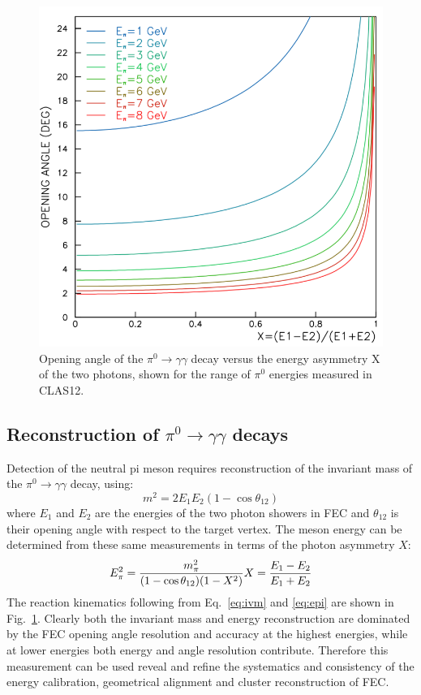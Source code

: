 \begin{figure}[h]
\centering
\includegraphics[width=0.7\columnwidth,keepaspectratio]{img/opa.png}
\caption[]{Opening angle of the $\pi^0 \rightarrow \gamma \gamma$ decay versus the energy asymmetry X of the two photons, shown for the range of $\pi^0$ energies measured in CLAS12. }
\label{fig:opa}
\end{figure}

\subsection{Reconstruction of $\pi^0\rightarrow \gamma \gamma$ decays}

Detection of the neutral pi meson requires reconstruction of the invariant mass of the $\pi^0 \rightarrow \gamma \gamma$ decay, using:
\begin{equation}
m^2 = 2 E_1 E_2 (1-\cos \theta_{12})
\label{eq:ivm}
\end{equation}
 where $E_1$ and $E_2$ are the energies of the two photon showers in FEC and $\theta_{12}$ is their opening angle with respect to the target vertex.  The meson energy can be determined from these same measurements in terms of the photon asymmetry $X$:
\begin{equation}
E^2_{\pi} = \frac{m^2_{\pi}}{(1-\cos \theta_{12})(1-X^2)}  \\
X=\frac{E_1-E_2}{E_1+E_2}
\label{eq:epi}
\end{equation}
The reaction kinematics following from Eq.~\ref{eq:ivm} and \ref{eq:epi} are shown in Fig.~\ref{fig:opa}.  Clearly both the invariant mass and energy reconstruction are dominated by the FEC opening angle resolution and accuracy at the highest energies, while at lower energies both energy and angle resolution contribute.   Therefore this measurement can be used reveal and refine the systematics and consistency of the energy calibration, geometrical alignment and cluster reconstruction of FEC.

